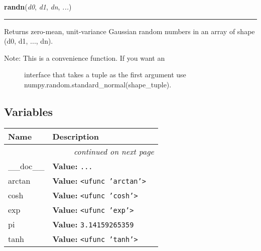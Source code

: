     \begin{boxedminipage}{\textwidth}

    \raggedright \textbf{randn}(\textit{d0}, \textit{d1}, \textit{dn}, \textit{...})

    \vspace{-1.5ex}

    \rule{\textwidth}{0.5\fboxrule}

Returns zero-mean, unit-variance Gaussian random numbers in an
array of shape (d0, d1, ..., dn).
\begin{description}
\item[{Note:  This is a convenience function. If you want an}] %

interface that takes a tuple as the first argument
use numpy.random.standard{\_}normal(shape{\_}tuple).

\end{description}
    \vspace{1ex}

    \end{boxedminipage}



  \subsection{Variables}

\begin{longtable}{|p{}|p{}|l}
\cline{1-2}
\cline{1-2} \centering \textbf{Name} & \centering \textbf{Description}& \\
\cline{1-2}
\endhead\cline{1-2}\multicolumn{3}{r}{\small\textit{continued on next page}}\\\endfoot\cline{1-2}
\endlastfoot\raggedright \_\-\_\-d\-o\-c\-\_\-\_\- & \raggedright \textbf{Value:} 
{\tt \texttt{...}}&\\
\cline{1-2}
\raggedright a\-r\-c\-t\-a\-n\- & \raggedright \textbf{Value:} 
{\tt {\textless}ufunc 'arctan'{\textgreater}}&\\
\cline{1-2}
\raggedright c\-o\-s\-h\- & \raggedright \textbf{Value:} 
{\tt {\textless}ufunc 'cosh'{\textgreater}}&\\
\cline{1-2}
\raggedright e\-x\-p\- & \raggedright \textbf{Value:} 
{\tt {\textless}ufunc 'exp'{\textgreater}}&\\
\cline{1-2}
\raggedright p\-i\- & \raggedright \textbf{Value:} 
{\tt 3.14159265359}&\\
\cline{1-2}
\raggedright t\-a\-n\-h\- & \raggedright \textbf{Value:} 
{\tt {\textless}ufunc 'tanh'{\textgreater}}&\\
\cline{1-2}
\end{longtable}


